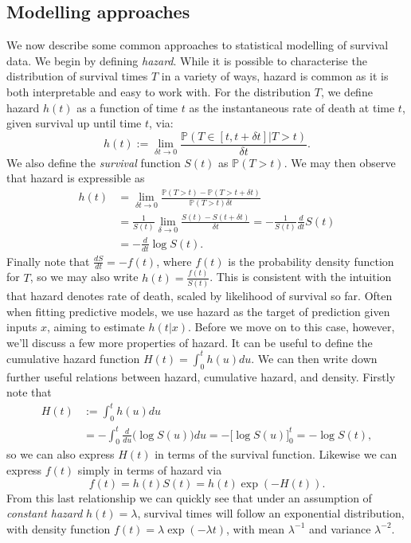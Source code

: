 \documentclass[../thesis.tex]{subfiles}
\begin{document}
\subsection{Modelling approaches} \label{sec:survival_modelling}
We now describe some common approaches to statistical modelling of survival data. We begin by defining \textit{hazard}. While it is possible to characterise the distribution of survival times $T$ in a variety of ways, hazard is common as it is both interpretable and easy to work with. For the distribution $T$, we define hazard $h(t)$ as a function of time $t$ as the instantaneous rate of death at time $t$, given survival up until time $t$, via:
\[
    h(t) := \lim_{\delta t \rightarrow 0} \frac{\mathbb{P}(T \in [t, t + \delta t] | T > t)}{\delta t}.
\]
We also define the \textit{survival} function $S(t)$ as $\mathbb{P}(T > t)$. We may then observe that hazard is expressible as 
\begin{align*}
    h(t) & = \lim_{\delta t \rightarrow 0} \frac{\mathbb{P}(T > t) - \mathbb{P}(T > t + \delta t)}{\mathbb{P}(T > t) \delta t} \\
    & = \frac{1}{S(t)} \lim_{\delta \rightarrow 0} \frac{S(t) - S(t + \delta t)}{\delta t} = - \frac{1}{S(t)} \frac{d}{dt} S(t)\\
    & = - \frac{d}{dt} \log S(t). 
\end{align*}
Finally note that $\frac{dS}{dt} = - f(t)$, where $f(t)$ is the probability density function for $T$, so we may also write $h(t) = \frac{f(t)}{S(t)}$. This is consistent with the intuition that hazard denotes rate of death, scaled by likelihood of survival so far. Often when fitting predictive models, we use hazard as the target of prediction given inputs $x$, aiming to estimate $h(t|x)$. Before we move on to this case, however, we'll discuss a few more properties of hazard. It can be useful to define the cumulative hazard function $H(t) = \int_{0}^{t}h(u)du$. We can then write down further useful relations between hazard, cumulative hazard, and density. Firstly note that 
\begin{align*}
H(t) & := \int_{0}^{t}h(u)du \\
& = -\int_{0}^{t}\frac{d}{du} \big(\log S(u)\big) du  = - \big[\log S(u) \big]_{0}^{t}  = -\log S(t),
\end{align*}
so we can also express $H(t)$ in terms of the survival function. Likewise we can express $f(t)$ simply in terms of hazard via
\[ f(t) = h(t)S(t) = h(t)\exp (-H(t)).\]
From this last relationship we can quickly see that under an assumption of \emph{constant hazard} $h(t)=\lambda$, survival times will follow an exponential distribution, with density function $f(t) = \lambda \exp(-\lambda t)$, with mean $\lambda^{-1}$ and variance $\lambda^{-2}$.
\end{document}
